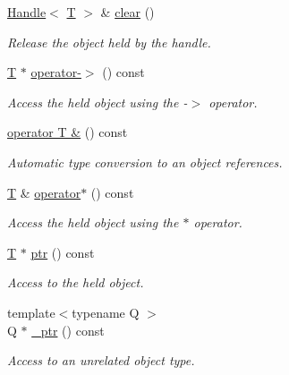 \begin{DoxyCompactItemize}
\hyperlink{class_d_d4hep_1_1_handle}{Handle}$<$ \hyperlink{class_t}{T} $>$ \& \hyperlink{class_d_d4hep_1_1_handle_ad50d0ea67a1c9a4e87d232f96ebe52f1}{clear} ()
\begin{DoxyCompactList}\small\item\em Release the object held by the handle. \item\end{DoxyCompactList}\item 
\hyperlink{class_t}{T} $\ast$ \hyperlink{class_d_d4hep_1_1_handle_afb3984a2a89e50232d519c535818d74b}{operator-\/$>$} () const 
\begin{DoxyCompactList}\small\item\em Access the held object using the -\/$>$ operator. \item\end{DoxyCompactList}\item 
\hyperlink{class_d_d4hep_1_1_handle_a065ea7927cff8151c3fb800dbef5658c}{operator T \&} () const 
\begin{DoxyCompactList}\small\item\em Automatic type conversion to an object references. \item\end{DoxyCompactList}\item 
\hyperlink{class_t}{T} \& \hyperlink{class_d_d4hep_1_1_handle_a9524715e3d0523206bc51be8c13deb32}{operator$\ast$} () const 
\begin{DoxyCompactList}\small\item\em Access the held object using the $\ast$ operator. \item\end{DoxyCompactList}\item 
\hyperlink{class_t}{T} $\ast$ \hyperlink{class_d_d4hep_1_1_handle_a51a7d12a15a2a18977a0036bc6435cc8}{ptr} () const 
\begin{DoxyCompactList}\small\item\em Access to the held object. \item\end{DoxyCompactList}\item 
{\footnotesize template$<$typename Q $>$ }\\Q $\ast$ \hyperlink{class_d_d4hep_1_1_handle_a72866c3c06a9e008cc390b7a1ef859e7}{\_\-ptr} () const 
\begin{DoxyCompactList}\small\item\em Access to an unrelated object type. \item\end{DoxyCompactList}\item 

\end{DoxyCompactItemize}
